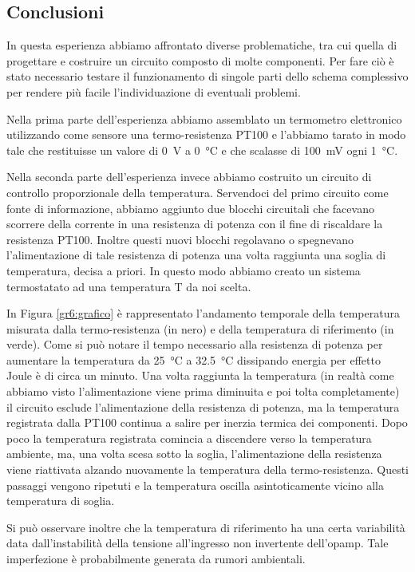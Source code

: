 \subsection*{Conclusioni}

In questa esperienza abbiamo affrontato diverse problematiche, tra cui quella di progettare e costruire un circuito composto di molte componenti.
Per fare ciò è stato necessario testare il funzionamento di singole parti dello schema complessivo per rendere più facile l'individuazione di eventuali problemi.

Nella prima parte dell'esperienza abbiamo assemblato un termometro elettronico utilizzando come sensore una termo-resistenza PT100 e l'abbiamo tarato in modo tale che restituisse un valore di \SI{0}{\V} a \SI{0}{\celsius} e che scalasse di \SI{100}{\mV} ogni \SI{1}{\celsius}.

Nella seconda parte dell'esperienza invece abbiamo costruito un circuito di controllo proporzionale della temperatura.
Servendoci del primo circuito come fonte di informazione, abbiamo aggiunto due blocchi circuitali che facevano scorrere della corrente in una resistenza di potenza con il fine di riscaldare la resistenza PT100.
Inoltre questi nuovi blocchi regolavano o spegnevano l'alimentazione di tale resistenza di potenza una volta raggiunta una soglia di temperatura, decisa a priori.
In questo modo abbiamo creato un sistema termostatato ad una temperatura T da noi scelta.

In Figura \ref{gr6:grafico} è rappresentato l'andamento temporale della temperatura misurata dalla termo-resistenza (in nero) e della temperatura di riferimento (in verde).
Come si può notare il tempo necessario alla resistenza di potenza per aumentare la temperatura da \SI{25}{\celsius} a \SI{32.5}{\celsius} dissipando energia per effetto Joule è di circa un minuto.
Una volta raggiunta la temperatura (in realtà come abbiamo visto l'alimentazione viene prima diminuita e poi tolta completamente) il circuito esclude l'alimentazione della resistenza di potenza, ma la temperatura registrata dalla PT100 continua a salire per inerzia termica dei componenti.
Dopo poco la temperatura registrata comincia a discendere verso la temperatura ambiente, ma, una volta scesa sotto la soglia, l'alimentazione della resistenza viene riattivata alzando nuovamente la temperatura della termo-resistenza.
Questi passaggi vengono ripetuti e la temperatura oscilla asintoticamente vicino alla temperatura di soglia.

Si può osservare inoltre che la temperatura di riferimento ha una certa variabilità data dall'instabilità della tensione all'ingresso non invertente dell'opamp. Tale imperfezione è probabilmente generata da rumori ambientali.